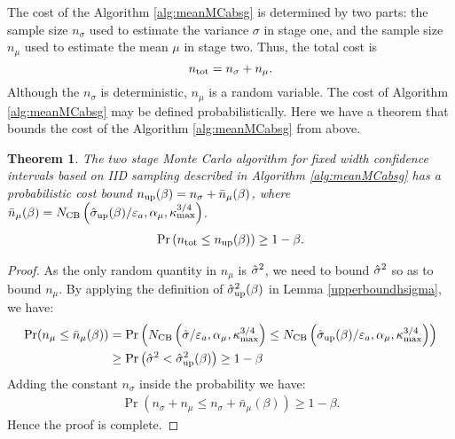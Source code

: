 \documentclass{iitthesis}
\newtheorem{theorem}{Theorem}[section]
\theoremstyle{definition}
\begin{document}
\label{sec:meanMCabsgcost}

The cost of the Algorithm \ref{alg:meanMCabsg} is determined by two parts: the sample size $n_{\sigma}$ used to estimate the variance $\sigma$ in stage one, and the sample size $n_\mu$ used to estimate the mean $\mu$ in stage two. Thus, the total cost is 
$$n_{\operatorname{tot}} = n_\sigma+n_\mu.$$
Although the $n_\sigma$ is deterministic, $n_\mu$ is a random variable. The cost of Algorithm \ref{alg:meanMCabsg} may be defined probabilistically. Here we have a theorem that bounds the cost of the Algorithm \ref{alg:meanMCabsg} from above.

\begin{theorem}\label{thm:meanMCabsgcost}
The two stage Monte Carlo algorithm for fixed width confidence intervals based on IID sampling described in Algorithm \ref{alg:meanMCabsg} has a probabilistic cost bound $n_{\operatorname{up}}(\beta) =n_\sigma+\bar{n}_{\mu}(\beta)$, where $\bar{n}_{\mu}(\beta)=N_{\text{CB}}\left(\hat{\sigma}_{\operatorname{up}}(\beta)/\varepsilon_a,\alpha_\mu, \kappa_{\max}^{3/4}\right)$.
\begin{align}
\Pr \left(n_{\operatorname{tot}} \leq n_{\operatorname{up}}(\beta)\right)  \geq 1-\beta.
\end{align}
\end{theorem}

\begin{proof}
As the only random quantity in $n_\mu$ is $\hat{\sigma}^2$, we need to bound $\hat{\sigma}^2$ so as to bound $n_{\mu}$.
 By applying the definition of $\hat{\sigma}_{\operatorname{up}}^2(\beta)$ in Lemma \ref{upperboundhsigma}, we have:
\begin{align*}
\Pr(n_{\mu} \leq \bar{n}_{\mu}(\beta))  &= \Pr\left (N_{\text{CB}}\left(\hat{\sigma}/\varepsilon_a,\alpha_\mu, \kappa_{\max}^{3/4}\right) \leq N_{\text{CB}}\left(\hat{\sigma}_{\operatorname{up}}(\beta)/\varepsilon_a,\alpha_\mu, \kappa_{\max}^{3/4}\right) \right)\\&
 \geq \Pr \left(\hat{\sigma}^2 < \hat{\sigma}_{\operatorname{up}}^2(\beta) \right) \geq 1-\beta
\end{align*}
Adding the constant $n_\sigma$ inside the probability we have:
\begin{align*}
 \Pr(n_\sigma+n_{\mu} \leq n_\sigma+\bar{n}_{\mu}(\beta))   \geq 1-\beta.
\end{align*}
Hence the proof is complete.
\end{proof}
\label{sec:numericalintegrationviaMC}
\end{document}
